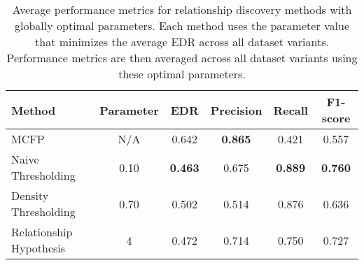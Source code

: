 \begin{table}[ht]
\centering
\caption{Average performance metrics for relationship discovery methods with globally optimal parameters. Each method uses the parameter value that minimizes the average EDR across all dataset variants. Performance metrics are then averaged across all dataset variants using these optimal parameters.}
\label{tab:relationship_methods_global_optimal}
\begin{tabular}{lccccc}
\toprule
Method & Parameter & EDR & Precision & Recall & F1-score \\
\midrule
MCFP & N/A & 0.642 & \textbf{0.865} & 0.421 & 0.557 \\
Naive Thresholding & 0.10 & \textbf{0.463} & 0.675 & \textbf{0.889} & \textbf{0.760} \\
Density Thresholding & 0.70 & 0.502 & 0.514 & 0.876 & 0.636 \\
Relationship Hypothesis & 4 & 0.472 & 0.714 & 0.750 & 0.727 \\
\bottomrule
\end{tabular}
\end{table}
